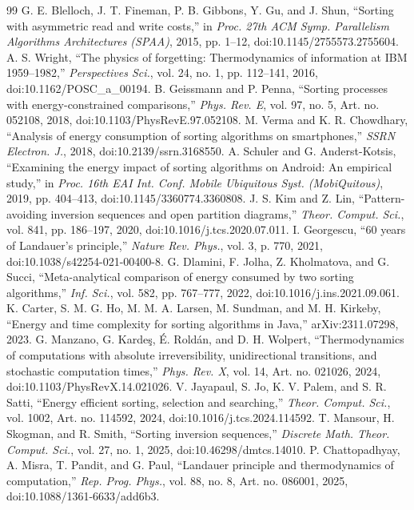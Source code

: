 \documentclass[10pt,journal]{IEEEtran}
\begin{document}
\begin{thebibliography}{99}
 G. E. Blelloch, J. T. Fineman, P. B. Gibbons, Y. Gu, and J. Shun, ``Sorting with asymmetric read and write costs,'' in \emph{Proc. 27th ACM Symp. Parallelism Algorithms Architectures (SPAA)}, 2015, pp. 1--12, doi:10.1145/2755573.2755604.
 A. S. Wright, ``The physics of forgetting: Thermodynamics of information at IBM 1959--1982,'' \emph{Perspectives Sci.}, vol. 24, no. 1, pp. 112--141, 2016, doi:10.1162/POSC\_a\_00194.
 B. Geissmann and P. Penna, ``Sorting processes with energy-constrained comparisons,'' \emph{Phys. Rev. E}, vol. 97, no. 5, Art. no. 052108, 2018, doi:10.1103/PhysRevE.97.052108.
 M. Verma and K. R. Chowdhary, ``Analysis of energy consumption of sorting algorithms on smartphones,'' \emph{SSRN Electron. J.}, 2018, doi:10.2139/ssrn.3168550.
 A. Schuler and G. Anderst-Kotsis, ``Examining the energy impact of sorting algorithms on Android: An empirical study,'' in \emph{Proc. 16th EAI Int. Conf. Mobile Ubiquitous Syst. (MobiQuitous)}, 2019, pp. 404--413, doi:10.1145/3360774.3360808.
 J. S. Kim and Z. Lin, ``Pattern-avoiding inversion sequences and open partition diagrams,'' \emph{Theor. Comput. Sci.}, vol. 841, pp. 186--197, 2020, doi:10.1016/j.tcs.2020.07.011.
 I. Georgescu, ``60 years of Landauer's principle,'' \emph{Nature Rev. Phys.}, vol. 3, p. 770, 2021, doi:10.1038/s42254-021-00400-8.
 G. Dlamini, F. Jolha, Z. Kholmatova, and G. Succi, ``Meta-analytical comparison of energy consumed by two sorting algorithms,'' \emph{Inf. Sci.}, vol. 582, pp. 767--777, 2022, doi:10.1016/j.ins.2021.09.061.
 K. Carter, S. M. G. Ho, M. M. A. Larsen, M. Sundman, and M. H. Kirkeby, ``Energy and time complexity for sorting algorithms in Java,'' arXiv:2311.07298, 2023.
 G. Manzano, G. Karde\c{s}, \'E. Rold\'an, and D. H. Wolpert, ``Thermodynamics of computations with absolute irreversibility, unidirectional transitions, and stochastic computation times,'' \emph{Phys. Rev. X}, vol. 14, Art. no. 021026, 2024, doi:10.1103/PhysRevX.14.021026.
 V. Jayapaul, S. Jo, K. V. Palem, and S. R. Satti, ``Energy efficient sorting, selection and searching,'' \emph{Theor. Comput. Sci.}, vol. 1002, Art. no. 114592, 2024, doi:10.1016/j.tcs.2024.114592.
 T. Mansour, H. Skogman, and R. Smith, ``Sorting inversion sequences,'' \emph{Discrete Math. Theor. Comput. Sci.}, vol. 27, no. 1, 2025, doi:10.46298/dmtcs.14010.
 P. Chattopadhyay, A. Misra, T. Pandit, and G. Paul, ``Landauer principle and thermodynamics of computation,'' \emph{Rep. Prog. Phys.}, vol. 88, no. 8, Art. no. 086001, 2025, doi:10.1088/1361-6633/add6b3.

\end{thebibliography}
\end{document}
